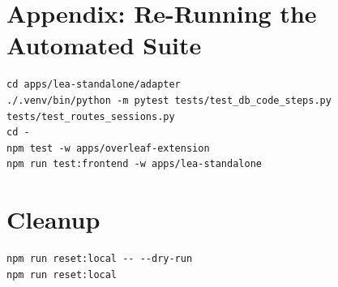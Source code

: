 \documentclass[11pt]{article}
\begin{document}
\section{Appendix: Re-Running the Automated Suite}
\begin{verbatim}
cd apps/lea-standalone/adapter
./.venv/bin/python -m pytest tests/test_db_code_steps.py tests/test_routes_sessions.py
cd -
npm test -w apps/overleaf-extension
npm run test:frontend -w apps/lea-standalone
\end{verbatim}

\section{Cleanup}
\begin{verbatim}
npm run reset:local -- --dry-run
npm run reset:local
\end{verbatim}
\end{document}
